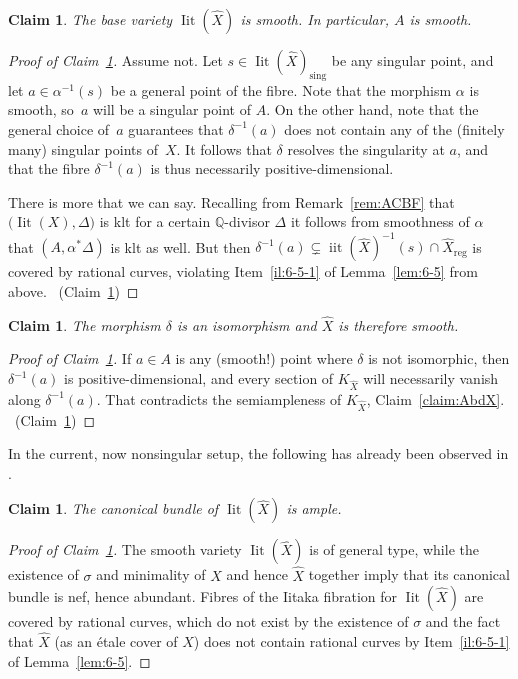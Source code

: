 \documentclass[JEP,XML,SOM,Unicode,published]{cedram}
\theoremstyle{plain}
\newtheorem{claim}[thm]{Claim}
\theoremstyle{definition}
\numberwithin{equation}{thm}
\numberwithin{enumi}{thm}
\newcommand{\reg}{\mathrm{reg}}
\DeclareMathOperator{\sing}{sing}
\DeclareMathOperator{\iit}{iit}
\DeclareMathOperator{\Iit}{Iit}
\newcommand{\bQ}{\mathbb{Q}}
\let\what\widehat
\begin{document}
\begin{claim}\label{claim:6-39}
The base variety $\Iit(\what{X})$ is smooth. In particular, $A$ is smooth.
\end{claim}
\begin{proof}[Proof of Claim~\ref{claim:6-39}]
Assume not. Let $s \in \Iit(\what{X})_{\sing}$ be any singular point, and let
$a \in \alpha^{-1}(s)$ be a general point of the fibre. Note that the morphism $\alpha$
is smooth, so~$a$ will be a singular point of $A$. On the other hand, note
that the general choice of~$a$ guarantees that $\delta^{-1}(a)$ does not contain
any of the (finitely many) singular points of~$X$. It follows that $\delta$
resolves the singularity at $a$, and that the fibre $\delta^{-1}(a)$ is thus
necessarily positive-dimensional.

There is more that we can say. Recalling from Remark~\ref{rem:ACBF} that
$\bigl(\Iit(X), \Delta \bigr)$ is klt for a certain $\bQ$-divisor $\Delta$ it follows
from smoothness of $\alpha$ that $(A, \alpha^*\Delta)$ is klt as well. But then
$\delta^{-1}(a) \subsetneq \iit(\what{X})^{-1}(s) \cap \what{X}_{\reg}$ is covered by rational
curves, violating Item~\ref{il:6-5-1} of Lemma~\ref{lem:6-5} from above.
\qedhere~\mbox{(Claim~\ref{claim:6-39})}
\end{proof}

\begin{claim}\label{claim:6-40}
The morphism $\delta$ is an isomorphism and $\what{X}$ is therefore smooth.
\end{claim}
\begin{proof}[Proof of Claim~\ref{claim:6-40}]
If $a \in A$ is any (smooth!) point where $\delta$ is not isomorphic, then
$\delta^{-1}(a)$ is positive-dimensional, and every section of $K_{\what{X}}$ will
necessarily vanish along $\delta^{-1}(a)$. That contradicts the semiampleness of
$K_{\what{X}}$, Claim~\ref{claim:AbdX}.
\qedhere~\mbox{(Claim~\ref{claim:6-40})}
\end{proof}

In the current, now nonsingular setup, the following has already been observed
in \cite[Proof of Lem.\,5.1]{MR3030068}.

\begin{claim}\label{claim:6-41}
The canonical bundle of $\Iit(\what{X})$ is ample.
\end{claim}
\begin{proof}[Proof of Claim~\ref{claim:6-41}]
The smooth variety $\Iit(\what{X})$ is of general type, while the existence of
$\sigma$ and minimality of $X$ and hence $\what X$ together imply that its
canonical bundle is nef, hence abundant. Fibres of the Iitaka fibration for
$\Iit(\what{X})$ are covered by rational curves, which do not exist by the
existence of $\sigma$ and the fact that $\what X$ (as an étale cover of $X$) does
not contain rational curves by Item~\ref{il:6-5-1} of Lemma~\ref{lem:6-5}.
\end{proof}
\end{document}
